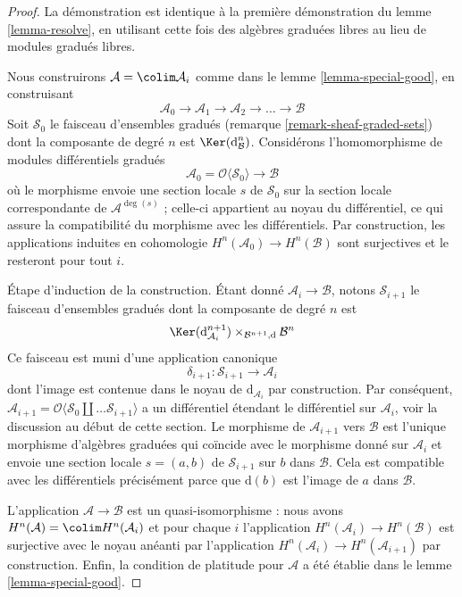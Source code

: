 \begin{proof} La
démonstration est identique à la première démonstration du
lemme \ref{lemma-resolve}, en utilisant cette fois des algèbres
graduées libres au lieu de modules gradués libres.

\medskip\noindent
Nous construirons $\mathcal{A} = \colim \mathcal{A}_i$ comme dans
le lemme \ref{lemma-special-good}, en construisant
$$
\mathcal{A}_0 \to \mathcal{A}_1 \to \mathcal{A}_2 \to \ldots \to \mathcal{B}
$$
Soit $\mathcal{S}_0$ le faisceau d'ensembles gradués
(remarque \ref{remark-sheaf-graded-sets})
dont la composante de degré $n$ est $\Ker(\text{d}_\mathcal{B}^n)$.
Considérons l'homomorphisme de
modules différentiels
gradués $$
\mathcal{A}_0 = \mathcal{O}\langle \mathcal{S}_0 \rangle
\longrightarrow
\mathcal{B}
$$
où le morphisme envoie une section locale $s$ de $\mathcal{S}_0$
sur la section locale correspondante de $\mathcal{A}^{\deg(s)}$ ;
celle-ci appartient au noyau du différentiel,
ce qui assure la compatibilité du morphisme avec les différentiels.
Par construction, les applications induites en cohomologie $H^n(\mathcal{A}_0) \to H^n(\mathcal{B})$
sont surjectives et le resteront pour tout $i$.

\medskip\noindent
Étape d'induction de la construction. Étant donné $\mathcal{A}_i \to \mathcal{B}$,
notons $\mathcal{S}_{i + 1}$ le faisceau d'ensembles gradués dont la composante de degré $n$
est $$
\Ker(\text{d}_{\mathcal{A}_i}^{n + 1})
\times_{\mathcal{B}^{n + 1}, \text{d}}
\mathcal{B}^n
$$
Ce faisceau est muni d'une application
canonique $$
\delta_{i + 1} : \mathcal{S}_{i + 1} \longrightarrow
\mathcal{A}_i
$$
dont l'image est contenue dans le noyau de $\text{d}_{\mathcal{A}_i}$
par construction. Par conséquent, $\mathcal{A}_{i + 1} = \mathcal{O}\langle
\mathcal{S}_0 \amalg \ldots \mathcal{S}_{i + 1}\rangle$ a un différentiel
étendant le différentiel sur $\mathcal{A}_i$, voir la discussion au début
de cette section. Le morphisme de $\mathcal{A}_{i + 1}$ vers
$\mathcal{B}$ est l'unique morphisme d'algèbres graduées qui
coïncide avec le morphisme donné sur $\mathcal{A}_i$ et envoie une
section locale $s = (a, b)$ de $\mathcal{S}_{i + 1}$ sur
$b$ dans $\mathcal{B}$. Cela est compatible avec les différentiels
précisément parce que $\text{d}(b)$ est l'image de $a$ dans $\mathcal{B}$.

\medskip\noindent
L'application $\mathcal{A} \to \mathcal{B}$ est un quasi-isomorphisme :
nous avons $H^n(\mathcal{A}) = \colim H^n(\mathcal{A}_i)$
et pour chaque $i$ l'application $H^n(\mathcal{A}_i) \to H^n(\mathcal{B})$
est surjective avec le noyau anéanti par l'application
$H^n(\mathcal{A}_i) \to H^n(\mathcal{A}_{i + 1})$ par construction.
Enfin, la condition de platitude pour $\mathcal{A}$ a été établie dans
le lemme \ref{lemma-special-good}.
\end{proof}






